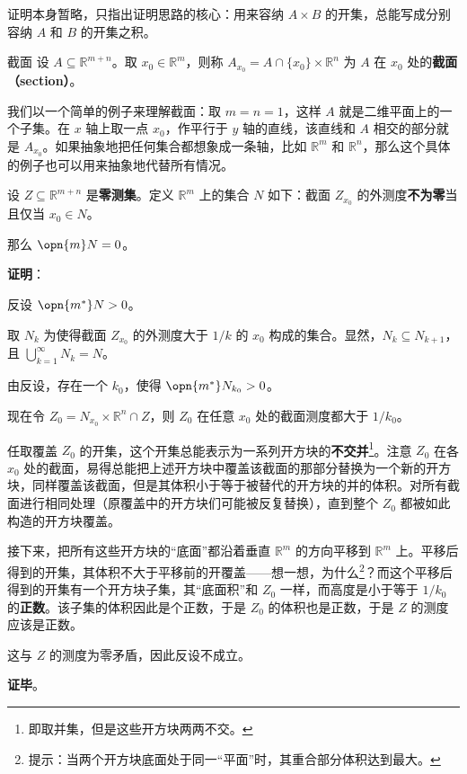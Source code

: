 证明本身暂略，只指出证明思路的核心：用来容纳 $A\times B$ 的开集，总能写成分别容纳 $A$ 和 $B$ 的开集之积。

\begin{definition}{截面}
设 $A\subseteq\mathbb{R}^{m+n}$。取 $x_0\in \mathbb{R}^m$，则称 $A_{x_0}=A\cap \{x_0\}\times \mathbb{R}^n$ 为 $A$ 在 $x_0$ 处的\textbf{截面（section）}。
\end{definition}

我们以一个简单的例子来理解截面：取 $m=n=1$，这样 $A$ 就是二维平面上的一个子集。在 $x$ 轴上取一点 $x_0$，作平行于 $y$ 轴的直线，该直线和 $A$ 相交的部分就是 $A_{x_0}$。如果抽象地把任何集合都想象成一条轴，比如 $\mathbb{R}^m$ 和 $\mathbb{R}^n$，那么这个具体的例子也可以用来抽象地代替所有情况。

\begin{theorem}{}
设 $Z\subseteq \mathbb{R}^{m+n}$ 是\textbf{零测集}。定义 $\mathbb{R}^m$ 上的集合 $N$ 如下：截面 $Z_{x_0}$ 的外测度\textbf{不为零}当且仅当 $x_0\in N$。

那么 $\opn{m}N=0$。
\end{theorem}

\textbf{证明}：

反设 $\opn{m^*}N>0$。

取 $N_k$ 为使得截面 $Z_{x_0}$ 的外测度大于 $1/k$ 的 $x_0$ 构成的集合。显然，$N_k\subseteq N_{k+1}$，且 $\bigcup_{k=1}^\infty N_k=N$。

由反设，存在一个 $k_0$，使得 $\opn{m^*}N_{k_0}>0$。

现在令 $Z_0=N_{x_0}\times\mathbb{R}^n \cap Z$，则 $Z_0$ 在任意 $x_0$ 处的截面测度都大于 $1/k_0$。

任取覆盖 $Z_0$ 的开集，这个开集总能表示为一系列开方块的\textbf{不交并}\footnote{即取并集，但是这些开方块两两不交。}。注意 $Z_0$ 在各 $x_0$ 处的截面，易得总能把上述开方块中覆盖该截面的那部分替换为一个新的开方块，同样覆盖该截面，但是其体积小于等于被替代的开方块的并的体积。对所有截面进行相同处理（原覆盖中的开方块们可能被反复替换），直到整个 $Z_0$ 都被如此构造的开方块覆盖。

接下来，把所有这些开方块的“底面”都沿着垂直 $\mathbb{R}^m$ 的方向平移到 $\mathbb{R}^m$ 上。平移后得到的开集，其体积不大于平移前的开覆盖——想一想，为什么\footnote{提示：当两个开方块底面处于同一“平面”时，其重合部分体积达到最大。}？而这个平移后得到的开集有一个开方块子集，其“底面积”和 $Z_0$ 一样，而高度是小于等于 $1/k_0$ 的\textbf{正数}。该子集的体积因此是个正数，于是 $Z_0$ 的体积也是正数，于是 $Z$ 的测度应该是正数。

这与 $Z$ 的测度为零矛盾，因此反设不成立。



\textbf{证毕}。

















